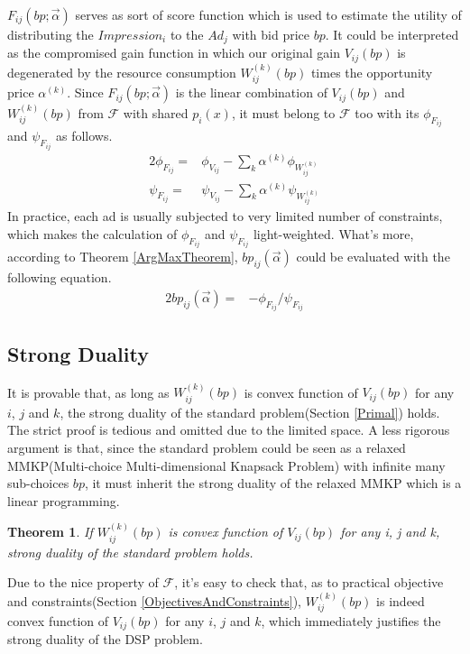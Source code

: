 \documentclass{article}
\newtheorem{theorem}{Theorem}[section]
\newcommand{\sbp}{bp_{ij}}
\newcommand{\sV}{V_{ij}}
\newcommand{\sW}{W_{ij}^{(k)}}
\newcommand{\salpha}{\alpha^{(k)}}
\newcommand{\sF}{F_{ij}}
\newcommand{\valpha}{\vec{\alpha}}
\newcommand{\pprob}{\phi}
\newcommand{\pcost}{\psi}
\newcommand{\uff}{\mathscr{F}}
\begin{document}
$\sF(bp; \valpha)$ serves as sort of score function which is used to estimate
    the utility of distributing the $Impression_i$ to the $Ad_j$ with bid price $bp$.
It could be interpreted as the compromised gain function in which
    our original gain $\sV(bp)$ is degenerated by the resource consumption $\sW(bp)$ times the opportunity price $\salpha$.
Since $\sF(bp; \valpha)$ is the linear combination of $\sV(bp)$ and $\sW(bp)$ from $\uff$ with shared $p_i(x)$,
    it must belong to $\uff$ too with its $\pprob_{\sF}$ and $\pcost_{\sF}$ as follows.
\begin{alignat}{2}
\pprob_{\sF}= & \pprob_{\sV} - \sum\limits_k \salpha \pprob_{\sW} \\
\pcost_{\sF}= & \pcost_{\sV} - \sum\limits_k \salpha \pcost_{\sW}
\end{alignat}
In practice, each ad is usually subjected to very limited number of constraints,
    which makes the calculation of $\pprob_{\sF}$ and $\pcost_{\sF}$ light-weighted.
What's more, according to Theorem \ref{ArgMaxTheorem}, $\sbp(\valpha)$ could be evaluated with the following equation.
\begin{alignat}{2}
\sbp(\valpha)= & - \pprob_{\sF} / \pcost_{\sF}
\end{alignat}

\subsection{Strong Duality}

It is provable that, as long as $\sW(bp)$ is convex function of $\sV(bp)$ for any $i$, $j$ and $k$,
    the strong duality of the standard problem(Section \ref{Primal}) holds.
The strict proof is tedious and omitted due to the limited space.
A less rigorous argument is that, since the standard problem could be seen as
    a relaxed MMKP(Multi-choice Multi-dimensional Knapsack Problem) with infinite many sub-choices $bp$,
    it must inherit the strong duality of the relaxed MMKP which is a linear programming.

\begin{theorem} \label{StrongDualityTheorem}
If $\sW(bp)$ is convex function of $\sV(bp)$ for any i, j and k, strong duality of the standard problem holds.
\end{theorem}

Due to the nice property of $\uff$, it's easy to check that,
    as to practical objective and constraints(Section \ref{ObjectivesAndConstraints}),
    $\sW(bp)$ is indeed convex function of $\sV(bp)$ for any $i$, $j$ and $k$,
    which immediately justifies the strong duality of the DSP problem.
\end{document}

